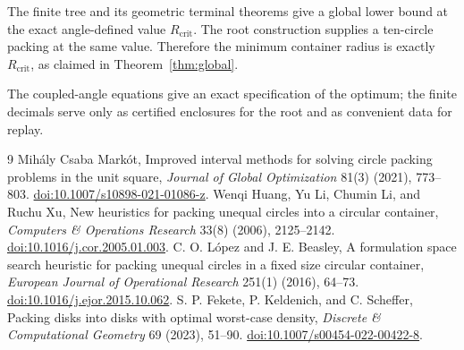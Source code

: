 \documentclass[11pt,a4paper]{article}
\theoremstyle{remark}
\newcommand{\Rcrit}{R_{\mathrm{crit}}}
\begin{document}
The finite tree and its geometric terminal theorems give a global lower bound
at the exact angle-defined value $\Rcrit$.  The root construction supplies a
ten-circle packing at the same value.  Therefore the minimum container radius
is exactly $\Rcrit$, as claimed in Theorem~\ref{thm:global}.

The coupled-angle equations give an exact specification of the optimum; the
finite decimals serve only as certified enclosures for the root and as
convenient data for replay.

\begin{thebibliography}{9}
Mih\'aly Csaba Mark\'ot,
\newblock Improved interval methods for solving circle packing problems in
the unit square,
\newblock \emph{Journal of Global Optimization} 81(3) (2021), 773--803.
\newblock \href{https://doi.org/10.1007/s10898-021-01086-z}
{doi:10.1007/s10898-021-01086-z}.
Wenqi Huang, Yu Li, Chumin Li, and Ruchu Xu,
\newblock New heuristics for packing unequal circles into a circular container,
\newblock \emph{Computers \& Operations Research} 33(8) (2006), 2125--2142.
\newblock \href{https://doi.org/10.1016/j.cor.2005.01.003}
{doi:10.1016/j.cor.2005.01.003}.
C. O. L\'opez and J. E. Beasley,
\newblock A formulation space search heuristic for packing unequal circles
in a fixed size circular container,
\newblock \emph{European Journal of Operational Research} 251(1) (2016),
64--73.
\newblock \href{https://doi.org/10.1016/j.ejor.2015.10.062}
{doi:10.1016/j.ejor.2015.10.062}.
S. P. Fekete, P. Keldenich, and C. Scheffer,
\newblock Packing disks into disks with optimal worst-case density,
\newblock \emph{Discrete \& Computational Geometry} 69 (2023), 51--90.
\newblock \href{https://doi.org/10.1007/s00454-022-00422-8}
{doi:10.1007/s00454-022-00422-8}.
\end{thebibliography}
\end{document}

